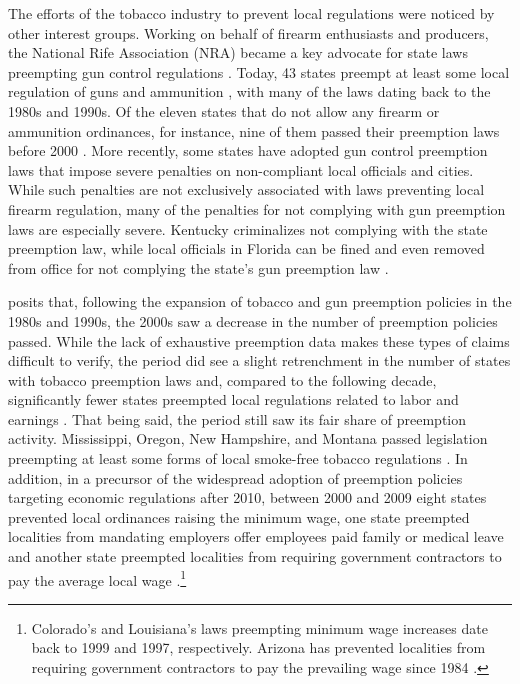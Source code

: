 \documentclass[12pt]{article}
\begin{document}
The efforts of the tobacco industry to prevent local regulations were noticed by other interest groups. Working on behalf of firearm enthusiasts and producers, the National Rife Association (NRA) became a key advocate for state laws preempting gun control regulations \parencite{hicksHomeRuleBe2018}. Today, 43 states preempt at least some local regulation of guns and ammunition \parencite{giffordslawcenterPreemptionLocalLawsn.d.,schraggerStatePreemptionLocal2017}, with many of the laws dating back to the 1980s and 1990s. Of the eleven states that do not allow any firearm or ammunition ordinances, for instance, nine of them passed their preemption laws before 2000 \parencite{schraggerStatePreemptionLocal2017}. More recently, some states have adopted gun control preemption laws that impose severe penalties on non-compliant local officials and cities. While such penalties are not exclusively associated with laws preventing local firearm regulation, many of the penalties for not complying with gun preemption laws are especially severe. Kentucky criminalizes not complying with the state preemption law, while local officials in Florida can be fined and even removed from office for not complying the state's gun preemption law \parencite{briffaultChallengeNewPreemption2018}.

\textcite{hicksHomeRuleBe2018} posits that, following the expansion of tobacco and gun preemption policies in the 1980s and 1990s, the 2000s saw a decrease in the number of preemption policies passed. While the lack of exhaustive preemption data makes these types of claims difficult to verify, the period did see a slight retrenchment in the number of states with tobacco preemption laws and, compared to the following decade, significantly fewer states preempted local regulations related to labor and earnings \parencite{centersfordiseasecontrolStatePreemptionLocal2010,vonwilpertCityGovernmentsAre2017}. That being said, the period still saw its fair share of preemption activity. Mississippi, Oregon, New Hampshire, and Montana passed legislation preempting at least some forms of local smoke-free tobacco regulations \parencite{centersfordiseasecontrolPreemptiveStateSmokeFree2005}. In addition, in a precursor of the widespread adoption of preemption policies targeting economic regulations after 2010, between 2000 and 2009 eight states prevented local ordinances raising the minimum wage, one state preempted localities from mandating employers offer employees paid family or medical leave and another state preempted localities from requiring government contractors to pay the average local wage \parencite{vonwilpertCityGovernmentsAre2017}.\footnote{Colorado's and Louisiana's laws preempting minimum wage increases date back to 1999 and 1997, respectively. Arizona has prevented localities from requiring government contractors to pay the prevailing wage since 1984 \parencite{economicpolicyinstituteWorkerRightsPreemption2018}.}
\end{document}
